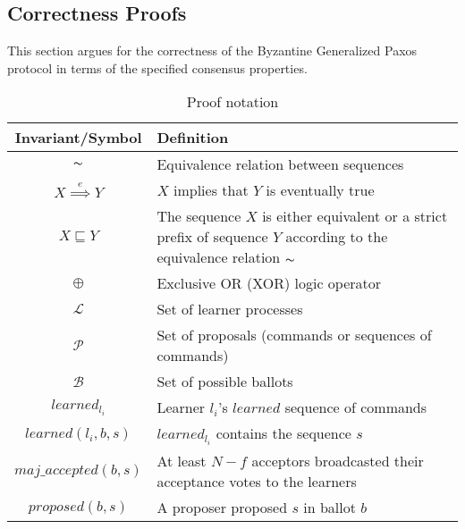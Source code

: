 \subsection{Correctness Proofs}

This section argues for the correctness of the Byzantine Generalized Paxos protocol in terms of the specified consensus properties.\par


\begin{table}[h!]
	\renewcommand{\arraystretch}{1.5}
	\centering
	\begin{tabularx}{\linewidth}{ |c|X|}
		\hline
		Invariant/Symbol & Definition \\
		\hline
		$\thicksim$ & Equivalence relation between sequences \\
		\hline
		$X \overset{e}{\implies} Y$ & $X$ implies that $Y$ is eventually true \\
		\hline
		$X \sqsubseteq Y$ & The sequence $X$ is either equivalent or a strict prefix of sequence $Y$ according to the equivalence relation $\thicksim$ \\
		\hline
		$\oplus$ & Exclusive OR (XOR) logic operator \\
		\hline
		$\mathcal{L}$ & Set of learner processes \\
		\hline
		$\mathcal{P}$ & Set of proposals (commands or sequences of commands) \\
		\hline
		$\mathcal{B}$ & Set of possible ballots \\
		\hline
		$learned_{l_i}$ & Learner $l_i$'s $learned$ sequence of commands \\
		\hline
		$learned(l_i,b,s)$ & $learned_{l_i}$ contains the sequence $s$\\
		\hline
		$maj\_accepted(b,s)$ & At least $N-f$ acceptors broadcasted their acceptance votes to the learners\\
		\hline
		$proposed(b,s)$ & A proposer proposed $s$ in ballot $b$ \\
		\hline
		
  	\end{tabularx} 
	\caption{Proof notation} 
	\label{table:1}
\end{table}

